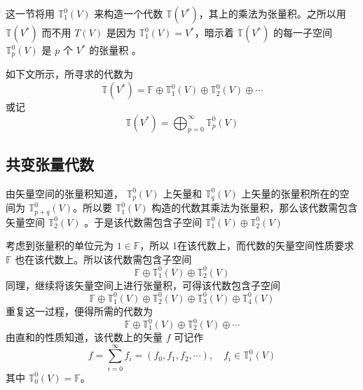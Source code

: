 
\begin{issues}
\end{issues}


这一节将用 $\mathbb T_1^0(V)$ 来构造一个代数 $\mathbb T(V^*)$，其上的乘法为张量积。之所以用 $\mathbb T(V^*)$ 而不用 $T(V)$ 是因为 $\mathbb T_1^0(V)=V^*$，暗示着 $\mathbb T(V^*)$ 的每一子空间 $\mathbb T_p^0(V)$ 是 $p$ 个 $V^*$ 的张量积 。 

如下文所示，所寻求的代数为
\begin{equation}
\mathbb T(V^*)=\mathbb F\oplus\mathbb T_1^0(V)\oplus\mathbb T_2^0(V)\oplus\cdots
\end{equation}
或记
\begin{equation}
\mathbb T(V^*)=\bigoplus_{p=0}^\infty\mathbb T_p^0(V)
\end{equation}
\subsection{共变张量代数}
由矢量空间的张量积知道， $\mathbb T_p^0(V)$ 上矢量和 $\mathbb T_q^0(V)$ 上矢量的张量积所在的空间为  $\mathbb T_{p+q}^0(V)$。所以要 $\mathbb T_1^0(V)$ 构造的代数其乘法为张量积，那么该代数需包含矢量空间 $\mathbb T_2^0(V)$ 。于是该代数需包含子空间 $\mathbb T_1^0(V)\oplus\mathbb T_2^0(V) $

 考虑到张量积的单位元为 $1\in\mathbb F$，所以 1在该代数上，而代数的矢量空间性质要求 $\mathbb F$ 也在该代数上。所以该代数需包含子空间
\begin{equation}
\mathbb F\oplus\mathbb T_1^0(V)\oplus\mathbb T_2^0(V) 
\end{equation} 
同理，继续将该矢量空间上进行张量积，可得该代数包含子空间
\begin{equation}
\mathbb F\oplus\mathbb T_1^0(V)\oplus\mathbb T_2^0(V)\oplus\mathbb T_3^0(V)\oplus\mathbb T_4^0(V)  
\end{equation}
重复这一过程，便得所需的代数为
\begin{equation}
\mathbb F\oplus\mathbb T_1^0(V)\oplus\mathbb T_2^0(V)\oplus\cdots
\end{equation}
由直和的性质知道，该代数上的矢量 $f$ 可记作
\begin{equation}\label{TenAlg_eq5}
f=\sum_{i=0}^\infty f_i=(f_0,f_1,f_2,\cdots),\quad f_i\in\mathbb T_i^0(V)
\end{equation}
其中 $\mathbb T_0^0(V)=\mathbb F$。


